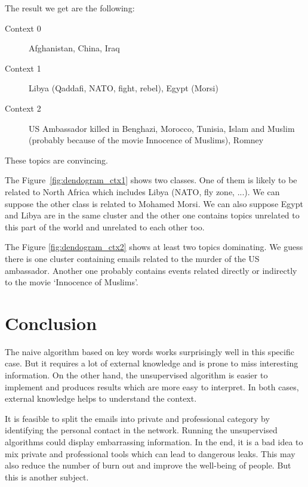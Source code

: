 \documentclass[11pt]{article}
\begin{document}
The result we get are the following:

\begin{description}
    \item[Context 0] Afghanistan, China, Iraq
    \item[Context 1] Libya (Qaddafi, NATO, fight, rebel), Egypt (Morsi)
    \item[Context 2] US Ambassador killed in Benghazi, Morocco, Tunisia, Islam and Muslim (probably because of the movie Innocence of Muslims), Romney
\end{description}

These topics are convincing.

The Figure~\ref{fig:dendogram_ctx1} shows two classes. One of them is likely to be related to North Africa which includes Libya (NATO, fly zone, ...). We can suppose the other class is related to Mohamed Morsi. We can also suppose Egypt and Libya are in the same cluster and the other one contains topics unrelated to this part of the world and unrelated to each other too.

The Figure \ref{fig:dendogram_ctx2} shows at least two topics dominating. We guess there is one cluster containing emails related to the murder of the US ambassador. Another one probably contains events related directly or indirectly to the movie `Innocence of Muslims'.

\section{Conclusion}

The naive algorithm based on key words works surprisingly well in this specific case. But it requires a lot of external knowledge and is prone to miss interesting information. On the other hand, the unsupervised algorithm is easier to implement and produces results which are more easy to interpret. In both cases, external knowledge helps to understand the context.

It is feasible to split the emails into private and professional category by identifying the personal contact in the network. Running the unsupervised algorithms could display embarrassing information. In the end, it is a bad idea to mix private and professional tools which can lead to dangerous leaks. This may also reduce the number of burn out and improve the well-being of people. But this is another subject.
\end{document}

